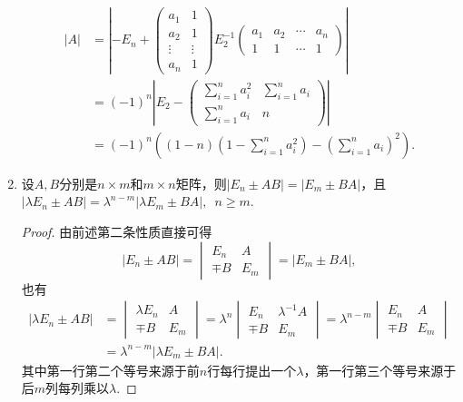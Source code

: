 \begin{enumerate}
\begin{solution}
            \begin{align*}
                |A| & = \left\vert-E_n + \begin{pmatrix}
                    a_1 & 1 \\ a_2 & 1 \\ \vdots & \vdots \\ a_n & 1
                \end{pmatrix} E_2^{-1} \begin{pmatrix}
                    a_1 & a_2 & \cdots & a_n \\ 1 & 1 & \cdots & 1
                \end{pmatrix}\right\vert \\
                &= (-1)^n \left|E_2 - \begin{pmatrix}
                    \sum\limits_{i=1}^n a_i^2 & \sum\limits_{i=1}^n a_i \\ \sum\limits_{i=1}^n a_i & n
                \end{pmatrix}\right| \\
                &= (-1)^n \left((1-n)\left(1-\sum\limits_{i=1}^n a_i^2\right) - \left(\sum\limits_{i=1}^n a_i\right)^2\right).
            \end{align*}
          \end{solution}

    \item 设$A,B$分别是$n \times m$和$m \times n$矩阵，则$|E_n \pm AB|=|E_m \pm BA|$，且 \\
          $|\lambda E_n \pm AB|=\lambda^{n-m}|\lambda E_m \pm BA|,\enspace n \geqslant m$.
          \begin{proof}
              由前述第二条性质直接可得
              \[|E_n \pm AB|=\begin{vmatrix}
                      E_n & A \\ \mp B & E_m
                  \end{vmatrix}=|E_m \pm BA|,\]
              也有
              \begin{align*}
                  |\lambda E_n \pm AB|
                   & =\begin{vmatrix}
                          \lambda E_n & A \\ \mp B & E_m
                      \end{vmatrix}=\lambda^n
                  \begin{vmatrix}
                      E_n & \lambda^{-1}A \\ \mp B & E_m
                  \end{vmatrix}=\lambda^{n-m}\begin{vmatrix}
                                                 E_n & A \\ \mp B & E_m
                                             \end{vmatrix} \\
                   & = \lambda^{n-m}|\lambda E_m \pm BA|.
              \end{align*}
              其中第一行第二个等号来源于前$n$行每行提出一个$\lambda$，第一行第三个等号来源于后$m$列每列乘以$\lambda$.
          \end{proof}


\end{enumerate}
